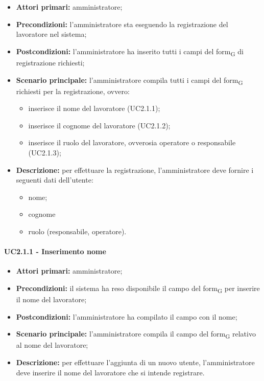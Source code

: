 \begin{itemize}
	\item 	\textbf{Attori primari:} amministratore;
	\item 	\textbf{Precondizioni:}	l'amministratore sta eseguendo la registrazione del lavoratore nel sistema;
	\item 	\textbf{Postcondizioni:} l'amministratore ha inserito tutti i campi del form\textsubscript{G} di registrazione richiesti;
	\item 	\textbf{Scenario principale:} l'amministratore compila tutti i campi del form\textsubscript{G} richiesti per la registrazione, ovvero:
	\begin{itemize}
		\item inserisce il nome del lavoratore (UC2.1.1);
		\item inserisce il cognome del lavoratore (UC2.1.2);
		\item inserisce il ruolo del lavoratore, ovverosia operatore o responsabile (UC2.1.3);
	\end{itemize}
	\item 	\textbf{Descrizione:} per effettuare la registrazione, l'amministratore deve fornire i seguenti dati dell'utente:
	\begin{itemize}
		\item nome;
		\item cognome
		\item ruolo (responsabile, operatore).
	\end{itemize}

\end{itemize}

\paragraph{UC2.1.1 - Inserimento nome}
\begin{itemize}
	\item 	\textbf{Attori primari:} amministratore;
	\item 	\textbf{Precondizioni:} il sistema ha reso disponibile il campo del form\textsubscript{G} per inserire il nome del lavoratore;
	\item 	\textbf{Postcondizioni:} l'amministratore ha compilato il campo con il nome;
	\item 	\textbf{Scenario principale:} l'amministratore compila il campo del form\textsubscript{G} relativo al nome del lavoratore;
	\item 	\textbf{Descrizione:} per effettuare l'aggiunta di un nuovo utente, l'amministratore deve inserire il nome del lavoratore che si intende registrare.

\end{itemize}

